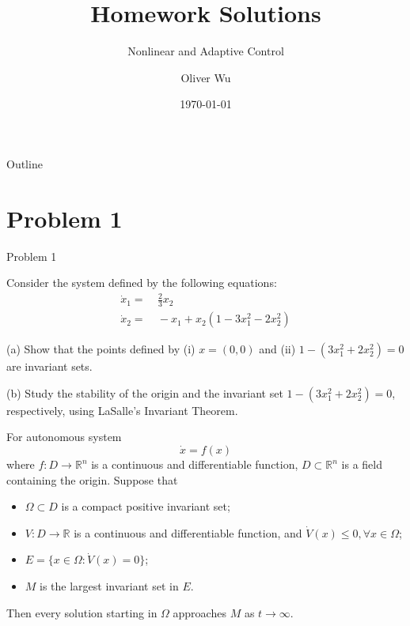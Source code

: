 \documentclass[8pt]{beamer}
\title[Homework Solutions] %
{Homework Solutions}
\subtitle
{Nonlinear and Adaptive Control}
\author[Oliver Wu] %
{Oliver Wu}
\date[\today] %
{\today}
\let\tempone\itemize
\let\temptwo\enditemize
\newenvironment{proitemize}{\vspace{-1em}\tempone}{\temptwo}%
\begin{document}
\setlength{\abovedisplayskip}{4pt}
\setlength{\belowdisplayskip}{4pt}

\begin{frame}
  \titlepage
\end{frame}

\begin{frame}{Outline}
  \tableofcontents
\end{frame}

\section{Problem 1}

\begin{frame}[t]{Problem 1}%
  \begin{block}{}
    Consider the system defined by the following equations:
  \begin{align*}
      \dot x_1=&~\frac{2}{3}x_2\\
      \dot x_2=&~-x_1+x_2(1-3x_1^2-2x_2^2)
  \end{align*}
  \begin{proitemize}
    \item[(a)] Show that the points defined by (i) $x=(0,0)$ and (ii) $1-(3x_1^2+2x_2^2)=0$ are invariant sets.
    \item[(b)] Study the stability of the origin and the invariant set $1-(3x_1^2+2x_2^2)=0$, respectively, using LaSalle's Invariant Theorem.
  \end{proitemize}
  \end{block}
  \begin{theorem}[LaSalle]
    \small
    For autonomous system
    \begin{equation}
      \dot{x}=f(x)
    \end{equation}
    where $f:D\to\mathbb{R}^n$ is a continuous and differentiable function, $D\subset\mathbb{R}^n$ is a field containing the origin. Suppose that
    \begin{itemize}
      \item $\Omega\subset D$ is a compact positive invariant set;
      \item $V:D\to\mathbb{R}$ is a continuous and differentiable function, and $\dot{V}(x)\le 0, \forall x\in \Omega$;
      \item $E=\{x\in\Omega: \dot{V}(x)= 0\}$;
      \item $M$ is the largest invariant set in $E$.
    \end{itemize}
    Then every solution starting in $\Omega$ approaches $M$ as $t\to\infty$.
  \end{theorem}
\end{frame}
\end{document}
